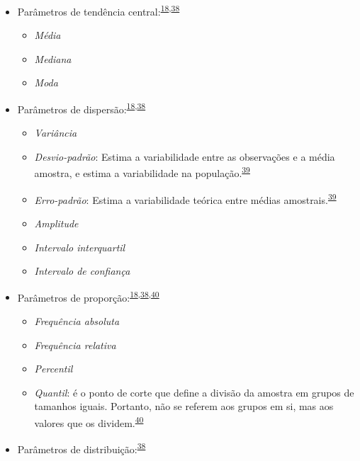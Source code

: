 \documentclass[
]{book}
\begin{document}
\begin{itemize}
\item
  Parâmetros de tendência central:\textsuperscript{\protect\hyperlink{ref-Ali2016}{18},\protect\hyperlink{ref-kanji2006}{38}}

  \begin{itemize}
  \item
    \emph{Média}
  \item
    \emph{Mediana}
  \item
    \emph{Moda}
  \end{itemize}
\item
  Parâmetros de dispersão:\textsuperscript{\protect\hyperlink{ref-Ali2016}{18},\protect\hyperlink{ref-kanji2006}{38}}

  \begin{itemize}
  \item
    \emph{Variância}
  \item
    \emph{Desvio-padrão}: Estima a variabilidade entre as observações e a média amostra, e estima a variabilidade na população.\textsuperscript{\protect\hyperlink{ref-Curran-Everett2008}{39}}
  \item
    \emph{Erro-padrão}: Estima a variabilidade teórica entre médias amostrais.\textsuperscript{\protect\hyperlink{ref-Curran-Everett2008}{39}}
  \item
    \emph{Amplitude}
  \item
    \emph{Intervalo interquartil}
  \item
    \emph{Intervalo de confiança}
  \end{itemize}
\item
  Parâmetros de proporção:\textsuperscript{\protect\hyperlink{ref-Ali2016}{18},\protect\hyperlink{ref-kanji2006}{38},\protect\hyperlink{ref-Altman1994}{40}}

  \begin{itemize}
  \item
    \emph{Frequência absoluta}
  \item
    \emph{Frequência relativa}
  \item
    \emph{Percentil}
  \item
    \emph{Quantil}: é o ponto de corte que define a divisão da amostra em grupos de tamanhos iguais. Portanto, não se referem aos grupos em si, mas aos valores que os dividem.\textsuperscript{\protect\hyperlink{ref-Altman1994}{40}}
  \end{itemize}
\item
  Parâmetros de distribuição:\textsuperscript{\protect\hyperlink{ref-kanji2006}{38}}


\end{itemize}
\end{document}
